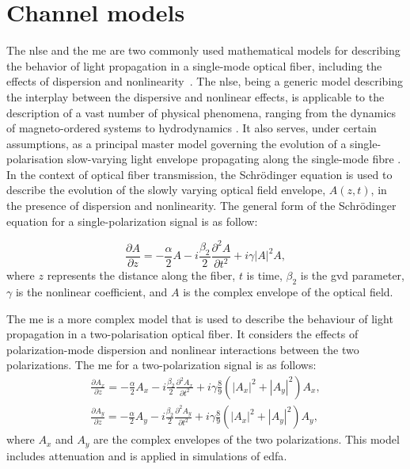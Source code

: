 \section{Channel models}

The \acrfull{nlse} and the \acrfull{me} are two commonly used mathematical models for describing the behavior of light propagation in a single-mode optical fiber, including the effects of dispersion and nonlinearity~\cite{Agrawal2010}.
The \acrshort{nlse}, being a generic model describing the interplay between the dispersive and nonlinear effects, is applicable to the description of a vast number of physical phenomena, ranging from the dynamics of magneto-ordered systems \cite{kik90} to hydrodynamics \cite{o10}. It also serves, under certain assumptions, as a principal master model governing the evolution of a single-polarisation slow-varying light envelope propagating along the single-mode fibre \cite{a12,mg06}. In the context of optical fiber transmission, the Schr\"odinger equation is used to describe the evolution of the slowly varying optical field envelope, $A(z,t)$, in the presence of dispersion and nonlinearity. The general form of the Schr\"odinger equation for a single-polarization signal is as follow:

\begin{equation}
	\frac{\partial A }{\partial z} = - \frac{\alpha}{2} A - i \frac{\beta_2}{2} \frac{\partial^2 A}{\partial t^2} + i \gamma |A|^2 A {,}
\label{eq:nlse_att}
\end{equation}
where $z$ represents the distance along the fiber, $t$ is time, $\beta_2$ is the \acrfull{gvd} parameter, $\gamma$ is the nonlinear coefficient, and $A$ is the complex envelope of the optical field.

The \acrlong{me} is a more complex model that is used to describe the behaviour of light propagation in a two-polarisation optical fiber. It considers the effects of polarization-mode dispersion and nonlinear interactions between the two polarizations. The \acrlong{me} for a two-polarization signal is as follows:
\begin{gather} 
\frac{\partial A_x}{\partial z} = -\frac{\alpha}{2} A_x - i\frac{\beta_2}{2}\frac{\partial^2 A_x}{\partial t^2} + i\gamma\frac{8}{9}\left(|A_x|^2 + |A_y|^2\right) A_x {,} \nonumber \\
\frac{\partial A_y}{\partial z} = -\frac{\alpha}{2} A_y - i\frac{\beta_2}{2}\frac{\partial^2 A_y}{\partial t^2} + i\gamma\frac{8}{9}\left(|A_x|^2 + |A_y|^2\right) A_y {,}
\label{eq:manakov_att}
\end{gather}
where $A_x$ and $A_y$ are the complex envelopes of the two polarizations. 
This model includes attenuation and is applied in simulations of \Gls{edfa}. 

